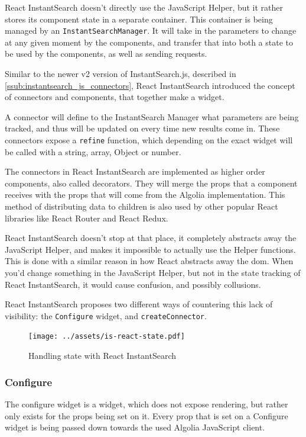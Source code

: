 React InstantSearch doesn't directly use the JavaScript Helper, but it rather stores its component state in a separate container. This container is being managed by an {\tt InstantSearchManager}. It will take in the parameters to change at any given moment by the components, and transfer that into both a state to be used by the components, as well as sending requests.

Similar to the newer v2 version of InstantSearch.js, described in \ref{ssub:instantsearch_js_connectors}, React InstantSearch introduced the concept of connectors and components, that together make a widget.

A connector will define to the InstantSearch Manager what parameters are being tracked, and thus will be updated on every time new results come in. These connectors expose a {\tt refine} function, which depending on the exact widget will be called with a string, array, Object or number.

The connectors in React InstantSearch are implemented as higher order components, also called decorators. They will merge the \gls{props} that a component receives with the \gls{props} that will come from the Algolia implementation. This method of distributing data to children is also used by other popular React libraries like React Router and React Redux.

React InstantSearch doesn't stop at that place, it completely abstracts away the JavaScript Helper, and makes it impossible to actually use the Helper functions. This is done with a similar reason in how React abstracts away the \acrshort{dom}. When you'd change something in the JavaScript Helper, but not in the state tracking of React InstantSearch, it would cause confusion, and possibly collusions.

React InstantSearch proposes two different ways of countering this lack of visibility: the {\tt Configure} widget, and {\tt createConnector}.

\begin{figure}[H]
  \centering
  \texttt{[image: ../assets/is-react-state.pdf]}
  \caption{Handling state with React InstantSearch}
  \label{figure:is-react-state}
\end{figure}

\subsubsection{Configure}
\label{ssub:ris-configure}

The configure widget is a widget, which does not expose rendering, but rather only exists for the \gls{props} being set on it. Every prop that is set on a Configure widget is being passed down towards the used Algolia JavaScript client.

